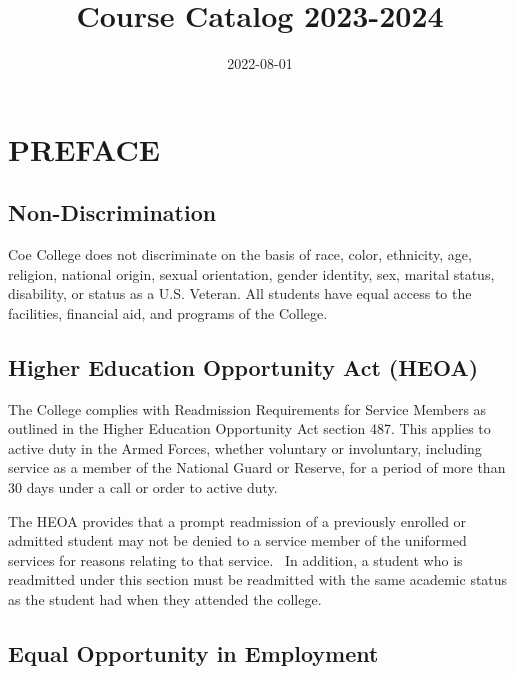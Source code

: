 \documentclass[
  letterpaper,
]{scrbook}
\title{Course Catalog 2023-2024}
\author{}
\date{2022-08-01}
\renewcommand*\contentsname{Table of contents}
\newcommand\contentsname{Table of contents}
\begin{document}
\frontmatter
\maketitle

\renewcommand*\contentsname{Table of contents}
{
\setcounter{tocdepth}{1}
\tableofcontents
}
\mainmatter
{}

\chapter*{PREFACE}\label{preface}


\section*{Non-Discrimination}\label{non-discrimination}


Coe College does not discriminate on the basis of race, color,
ethnicity, age, religion, national origin, sexual orientation, gender
identity, sex, marital status, disability, or status as a U.S. Veteran.
All students have equal access to the facilities, financial aid, and
programs of the College.

\section*{Higher Education Opportunity Act
(HEOA)}\label{higher-education-opportunity-act-heoa}


The College complies with Readmission Requirements for Service Members
as outlined in the Higher Education Opportunity Act section 487. This
applies to active duty in the Armed Forces, whether voluntary or
involuntary, including service as a member of the National Guard or
Reserve, for a period of more than 30 days under a call or order to
active duty.

The HEOA provides that a prompt readmission of a previously enrolled or
admitted student may not be denied to a service member of the uniformed
services for reasons relating to that service.~ In addition, a student
who is readmitted under this section must be readmitted with the same
academic status as the student had when they attended the college.

\section*{Equal Opportunity in
Employment}\label{equal-opportunity-in-employment}
\end{document}

